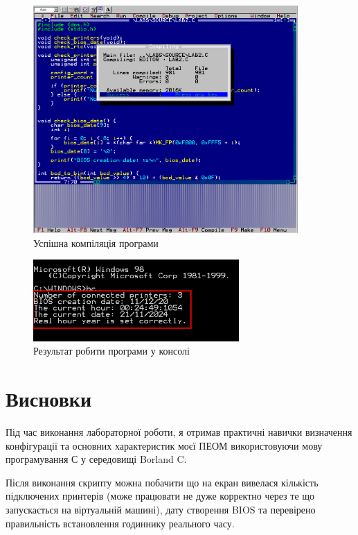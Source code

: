 \begin{figure}[h]
    \centering
    \includegraphics[width=0.9\textwidth]{reports/AC/lab2/assets/2.png}
    \caption{Успішна компіляція програми}
\end{figure}

\begin{figure}[h]
    \centering
    \includegraphics[width=0.7\textwidth]{reports/AC/lab2/assets/4.png}
    \caption{Результат робити програми у консолі}
\end{figure}

\clearpage
\section{Висновки}
    Під час виконання лабораторної роботи, я отримав практичні навички визначення конфігурації та основних
характеристик моєї ПЕОМ використовуючи мову програмування С у середовищі Borland C.

    Після виконання
скрипту можна побачити що на екран вивелася кількість підключених принтерів (може працювати не дуже
корректно через те що запускається на віртуальній машині), дату створення BIOS та перевірено правильність встановлення годиннику реального часу.
